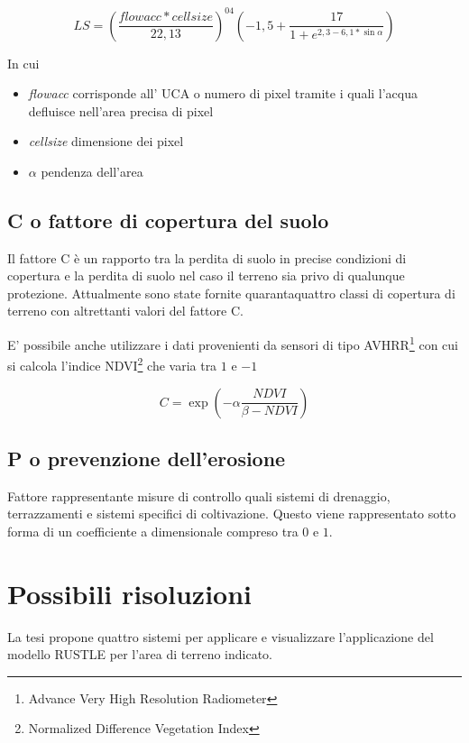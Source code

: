 \begin{equation}\label{eq:ls:edit}
LS=\left( \dfrac{flowacc * cellsize}{22,13}\right)^{04} \left( -1,5+\dfrac{17}{1+ e^{2,3-6,1*\sin{\alpha}}} \right)
\end{equation}

In cui
\begin{itemize}
	\item \textit{flowacc} corrisponde all' UCA  o numero di pixel tramite i quali l'acqua defluisce nell'area precisa di pixel
	\item \textit{cellsize} dimensione dei pixel
	\item \textit{$\alpha$} pendenza dell'area
\end{itemize}

\subsection{C o fattore di copertura del suolo}
Il fattore C è un rapporto tra la perdita di suolo in precise condizioni di copertura e la perdita di suolo nel caso il terreno sia privo di qualunque protezione.
Attualmente sono state fornite quarantaquattro classi di copertura di terreno con altrettanti valori del fattore C.

E' possibile anche utilizzare i dati provenienti da sensori di tipo AVHRR\footnote{Advance Very High Resolution Radiometer} con cui si calcola l'indice  NDVI\footnote{Normalized Difference Vegetation Index} che varia tra $1$ e $-1$

\begin{equation}\label{eq:c}
	C=\exp\left( -\alpha \dfrac{NDVI}{\beta -NDVI} \right)
\end{equation}

\subsection{P o prevenzione dell'erosione}
Fattore rappresentante misure di controllo quali sistemi di drenaggio, terrazzamenti e sistemi specifici di coltivazione.
Questo viene rappresentato sotto forma di un coefficiente a dimensionale compreso tra $0$ e $1$.

\section{Possibili risoluzioni}
La tesi \cite{tesi:ambientale} propone quattro sistemi per applicare e visualizzare l'applicazione del modello RUSTLE per l'area di terreno indicato.

